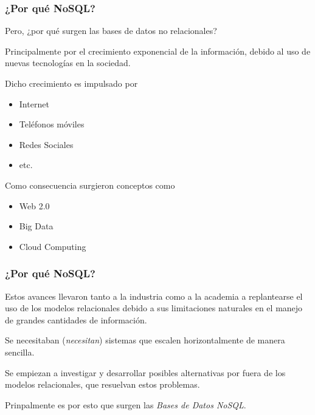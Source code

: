 \begin{frame}
    \frametitle{¿Por qué NoSQL?}

    Pero, ¿por qué surgen las bases de datos no relacionales?

     
    
    Principalmente por el crecimiento exponencial de la información, debido al uso de nuevas tecnologías en la sociedad.
    
     
    
    Dicho crecimiento es impulsado por

     
    
    \begin{itemize}
        \item Internet             
        \item Teléfonos móviles     
        \item Redes Sociales         
        \item etc.                   
    \end{itemize}

    Como consecuencia surgieron conceptos como

     

    \begin{itemize}
        \item Web 2.0
        \item Big Data
        \item Cloud Computing
    \end{itemize}
\end{frame}

\begin{frame}
    \frametitle{¿Por qué NoSQL?}

    Estos avances llevaron tanto a la industria como a la academia a replantearse el uso de los modelos relacionales debido a sus limitaciones naturales en el manejo de grandes cantidades de información.

     
    
    Se necesitaban (\textit{necesitan}) sistemas que escalen horizontalmente de manera sencilla.
    
     

    Se empiezan a investigar y desarrollar posibles alternativas por fuera de los modelos relacionales, que resuelvan estos problemas.
    
     

    Prinpalmente es por esto que surgen las \textit{Bases de Datos NoSQL}.
\end{frame}

